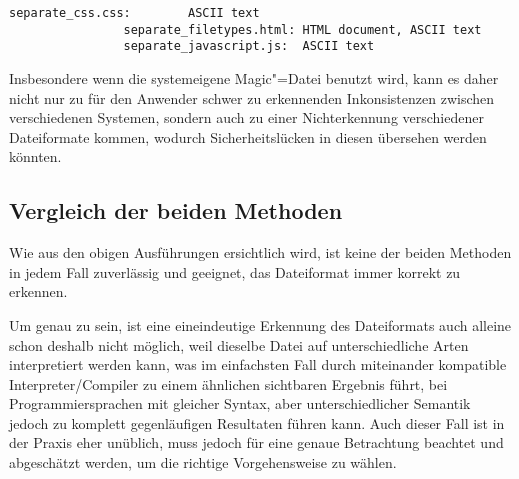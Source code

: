             \begin{lstlisting}[caption={Das Resultat von file bei separaten Dateien},
                gobble=16]
                separate_css.css:        ASCII text
                separate_filetypes.html: HTML document, ASCII text
                separate_javascript.js:  ASCII text
            \end{lstlisting}

            

            

            

            

            Insbesondere wenn die systemeigene Magic"=Datei benutzt wird,
            kann es daher nicht nur zu für den Anwender schwer zu erkennenden Inkonsistenzen zwischen verschiedenen Systemen,
            sondern auch zu einer Nichterkennung verschiedener Dateiformate kommen,
            wodurch Sicherheitslücken in diesen übersehen werden könnten.

        \subsection{Vergleich der beiden Methoden}\label{Vergleich Dateiformaterkennung}
            Wie aus den obigen Ausführungen ersichtlich wird,
            ist keine der beiden Methoden in jedem Fall zuverlässig und
            geeignet,
            das Dateiformat immer korrekt zu erkennen.

            Um genau zu sein,
            ist eine eineindeutige Erkennung des Dateiformats auch alleine schon deshalb nicht möglich,
            weil dieselbe Datei auf unterschiedliche Arten interpretiert werden kann,
            was im einfachsten Fall durch miteinander kompatible Interpreter/Compiler zu einem ähnlichen sichtbaren Ergebnis führt,
            bei Programmiersprachen mit gleicher Syntax,
            aber unterschiedlicher Semantik jedoch zu komplett gegenläufigen Resultaten führen kann.
            Auch dieser Fall ist in der Praxis eher unüblich,
            muss jedoch für eine genaue Betrachtung beachtet und
            abgeschätzt werden,
            um die richtige Vorgehensweise zu wählen.

